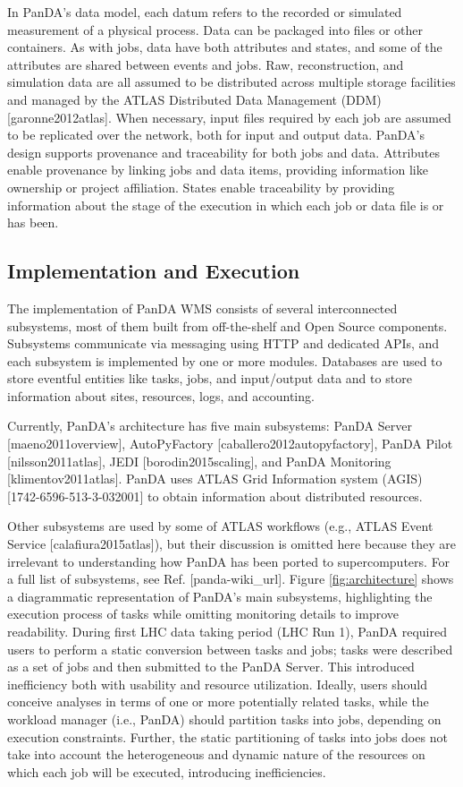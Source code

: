 In PanDA's data model, each datum refers to the recorded or simulated
measurement of a physical process. Data can be packaged into files or other
containers. As with jobs, data have both attributes and states, and some of
the attributes are shared between events and jobs. Raw, reconstruction, and
simulation data are all assumed to be distributed across multiple storage
facilities and managed by the ATLAS Distributed Data Management (DDM)
[garonne2012atlas]. When necessary, input files required by each job are
assumed to be replicated over the network, both for input and output data.
PanDA's design supports provenance and traceability for both jobs and data.
Attributes enable provenance by linking jobs and data items, providing
information like ownership or project affiliation. States enable traceability
by providing information about the stage of the execution in which each job
or data file is or has been.

\subsection{Implementation and Execution}
\label{subsec:implementation}

The implementation of PanDA WMS consists of several interconnected
subsystems, most of them built from off-the-shelf and Open Source components.
Subsystems communicate via messaging using HTTP and dedicated APIs, and each
subsystem is implemented by one or more modules. Databases are used to store
eventful entities like tasks, jobs, and input/output data and to store
information about sites, resources, logs, and accounting.

Currently, PanDA's architecture has five main subsystems: PanDA Server
[maeno2011overview], AutoPyFactory [caballero2012autopyfactory], PanDA Pilot
[nilsson2011atlas], JEDI [borodin2015scaling], and PanDA Monitoring
[klimentov2011atlas]. PanDA uses ATLAS Grid Information system (AGIS)
[1742-6596-513-3-032001] to obtain information about distributed resources.

Other subsystems are used by some of ATLAS workflows (e.g., ATLAS Event
Service [calafiura2015atlas]), but their discussion is omitted here because
they are irrelevant to understanding how PanDA has been ported to
supercomputers. For a full list of subsystems, see Ref. [panda-wiki\_url].
Figure \ref{fig:architecture} shows a diagrammatic representation of PanDA's
main subsystems, highlighting the execution process of tasks while omitting
monitoring details to improve readability. During first LHC data taking
period (LHC Run 1), PanDA required users to perform a static conversion
between tasks and jobs; tasks were described as a set of jobs and then
submitted to the PanDA Server. This introduced inefficiency both with
usability and resource utilization. Ideally, users should conceive analyses
in terms of one or more potentially related tasks, while the workload manager
(i.e., PanDA) should partition tasks into jobs, depending on execution
constraints. Further, the static partitioning of tasks into jobs does not
take into account the heterogeneous and dynamic nature of the resources on
which each job will be executed, introducing inefficiencies.

